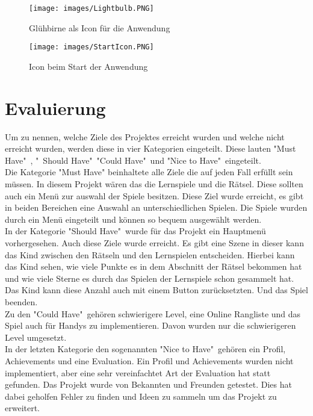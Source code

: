 \begin{figure}[htbp]
  \centering
  \texttt{[image: images/Lightbulb.PNG]}
  \caption{Glühbirne als Icon für die Anwendung}
  \label{Lightbulb}
\end{figure}
\begin{figure}[htbp]
  \centering
  \texttt{[image: images/StartIcon.PNG]}
  \caption{Icon beim Start der Anwendung}
  \label{BrainBook}
\end{figure}

\chapter{Evaluierung}
Um zu nennen, welche Ziele des Projektes erreicht wurden und welche nicht erreicht wurden, werden diese in vier Kategorien eingeteilt. Diese lauten "Must Have"\ , "\ Should Have"\, "Could Have"\ und "Nice to Have"\ eingeteilt.\\
Die Kategorie "Must Have" beinhaltete alle Ziele die auf jeden Fall erfüllt sein müssen. In diesem Projekt wären das die Lernspiele und die Rätsel. Diese sollten auch ein Menü zur auswahl der Spiele besitzen. Diese Ziel wurde erreicht, es gibt in beiden Bereichen eine Auswahl an unterschiedlichen Spielen. Die Spiele wurden durch ein Menü eingeteilt und können so bequem ausgewählt werden.\\
In der Kategorie "Should Have"\ wurde für das Projekt ein Hauptmenü vorhergesehen. Auch diese Ziele wurde erreicht. Es gibt eine Szene in dieser kann das Kind zwischen den Rätseln und den Lernspielen entscheiden. Hierbei kann das Kind sehen, wie viele Punkte es in dem Abschnitt der Rätsel bekommen hat und wie viele Sterne es durch das Spielen der Lernspiele schon gesammelt hat. Das Kind kann diese Anzahl auch mit einem Button zurücksetzten. Und das Spiel beenden.\\
Zu den "Could Have"\ gehören schwierigere Level, eine Online Rangliste und das Spiel auch für Handys zu implementieren. Davon wurden nur die schwierigeren Level umgesetzt.\\
In der letzten Kategorie den sogenannten "Nice to Have"\, gehören ein Profil, Achievements und eine Evaluation. Ein Profil und Achievements wurden nicht implementiert, aber eine sehr vereinfachtet Art der Evaluation hat statt gefunden. Das Projekt wurde von Bekannten und Freunden getestet. Dies hat dabei geholfen Fehler zu finden und Ideen zu sammeln um das Projekt zu erweitert.\\

